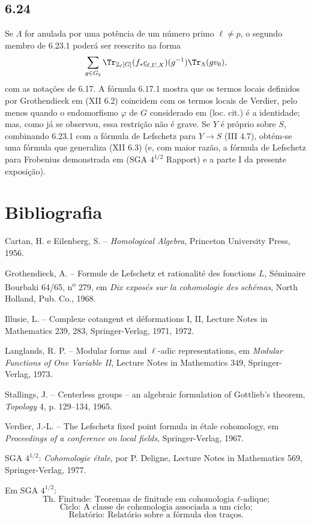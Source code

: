 \subsection*{6.24}
Se $\Lambda$ for anulada por uma potência de um número primo $\ell\ne p$, o segundo membro de 6.23.1 poderá ser reescrito na forma
\[
\sum_{g\in G_{\natural}}
\Tr_{\mathbb Z_{\ell}[G]}(f_*\underline c_{\ell,U,X})(g^{-1})
\Tr_{\Lambda}(gv_0),
\]
com as notações de 6.17. A fórmula 6.17.1 mostra que os termos locais definidos por Grothendieck em (XII 6.2) coincidem com os termos locais de Verdier, pelo menos quando o endomorfismo $\varphi$ de $G$ considerado em (loc. cit.) é a identidade; mas, como já se observou, essa restrição não é grave. Se $Y$ é próprio sobre $S$, combinando 6.23.1 com a fórmula de Lefschetz para $Y\to S$ (III 4.7), obtém-se uma fórmula que generaliza (XII 6.3) (e, com maior razão, a fórmula de Lefschetz para Frobenius demonstrada em (SGA $4^{1/2}$ Rapport) e a parte I da presente exposição).

\section*{Bibliografia}

\begin{enumerate}[label={[\arabic*]}]
\item Cartan, H. e Eilenberg, S. -- \textit{Homological Algebra}, Princeton University Press, 1956.
\item Grothendieck, A. -- Formule de Lefschetz et rationalité des fonctions $L$, Séminaire Bourbaki 64/65, n\textsuperscript{o} 279, em \textit{Dix exposés sur la cohomologie des schémas}, North Holland, Pub. Co., 1968.
\item Illusie, L. -- Complexe cotangent et déformations I, II, Lecture Notes in Mathematics 239, 283, Springer-Verlag, 1971, 1972.
\item Langlands, R. P. -- Modular forms and $\ell$-adic representations, em \textit{Modular Functions of One Variable II}, Lecture Notes in Mathematics 349, Springer-Verlag, 1973.
\item Stallings, J. -- Centerless groups -- an algebraic formulation of Gottlieb's theorem, \textit{Topology} 4, p. 129--134, 1965.
\item Verdier, J.-L. -- The Lefschetz fixed point formula in étale cohomology, em \textit{Proceedings of a conference on local fields}, Springer-Verlag, 1967.
\end{enumerate}

SGA $4^{1/2}$: \textit{Cohomologie étale}, por P. Deligne, Lecture Notes in Mathematics 569, Springer-Verlag, 1977.

Em SGA $4^{1/2}$:
\[
\text{Th. Finitude: Teoremas de finitude em cohomologia }\ell\text{-adique;}
\]
\[
\text{Ciclo: A classe de cohomologia associada a um ciclo;}
\]
\[
\text{Relatório: Relatório sobre a fórmula dos traços.}
\]
